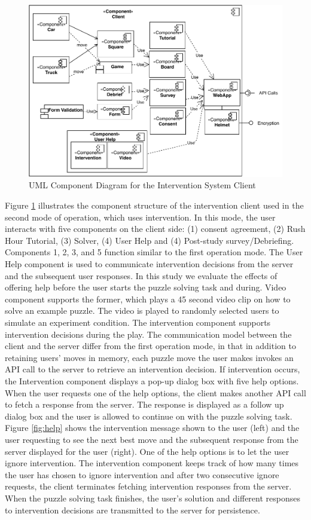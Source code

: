 \documentclass[doctor]{thesis} %
\theoremstyle{plain}
\begin{document}
\begin{figure}[!hbt]
  \centering
\includegraphics[width=\columnwidth]{img/componentclient.pdf}
  \caption{UML Component Diagram for the Intervention System Client}
  \label{fig:compclient}
\end{figure}

Figure \ref{fig:compclient} illustrates the component structure of the intervention client used in the second mode of operation, which uses intervention. In this mode, the user interacts with five components on the client side: (1) consent agreement, (2) Rush Hour Tutorial, (3) Solver, (4) User Help and (4) Post-study survey/Debriefing. Components 1, 2, 3, and 5 function similar to the first operation mode. The User Help component is used to communicate intervention decisions from the server and the subsequent user responses. In this study we evaluate the effects of offering help before the user starts the puzzle solving task and during. Video component supports the former, which plays a 45 second video clip on how to solve an example puzzle. The video is played to randomly selected users to simulate an experiment condition. The intervention component supports intervention decisions during the play. The communication model between the client and the server differ from the first operation mode, in that in addition to retaining users' moves in memory, each puzzle move the user makes invokes an API call to the server to retrieve an intervention decision. If intervention occurs, the Intervention component displays a pop-up dialog box with five help options. When the user requests one of the help options, the client makes another API call to fetch a response from the server. The response is displayed as a follow up dialog box and the user is allowed to continue on with the puzzle solving task. Figure \ref{fig:help} shows the intervention message shown to the user (left) and  the user requesting to see the next best move and the subsequent response from the server displayed for the user (right). One of the help options is to let the user ignore intervention. The intervention component keeps track of how many times the user has chosen to ignore intervention and after two consecutive ignore requests, the client terminates fetching intervention responses from the server. When the puzzle solving task finishes, the user's solution and different responses to intervention decisions are transmitted to the server for persistence.
\end{document}
